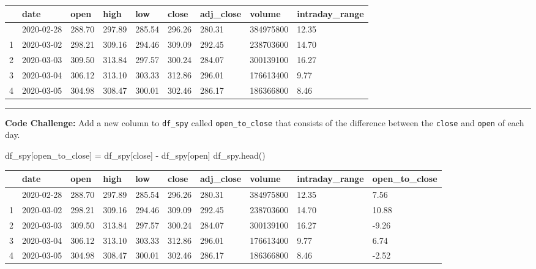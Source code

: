 \documentclass[
  letterpaper,
  DIV=11,
  numbers=noendperiod]{scrreprt}
\newenvironment{Shaded}{\begin{snugshade}}{\end{snugshade}}
\newcommand{\NormalTok}[1]{\textcolor[rgb]{0.00,0.23,0.31}{#1}}
\newcommand{\OperatorTok}[1]{\textcolor[rgb]{0.37,0.37,0.37}{#1}}
\newcommand{\StringTok}[1]{\textcolor[rgb]{0.13,0.47,0.30}{#1}}
\begin{document}
\begin{longtable}[]{@{}lllllllll@{}}
\toprule\noalign{}
& date & open & high & low & close & adj\_close & volume &
intraday\_range \\
\midrule\noalign{}
\endhead
\bottomrule\noalign{}
\endlastfoot
0 & 2020-02-28 & 288.70 & 297.89 & 285.54 & 296.26 & 280.31 & 384975800
& 12.35 \\
1 & 2020-03-02 & 298.21 & 309.16 & 294.46 & 309.09 & 292.45 & 238703600
& 14.70 \\
2 & 2020-03-03 & 309.50 & 313.84 & 297.57 & 300.24 & 284.07 & 300139100
& 16.27 \\
3 & 2020-03-04 & 306.12 & 313.10 & 303.33 & 312.86 & 296.01 & 176613400
& 9.77 \\
4 & 2020-03-05 & 304.98 & 308.47 & 300.01 & 302.46 & 286.17 & 186366800
& 8.46 \\
\end{longtable}

\begin{center}\rule{0.5\linewidth}{0.5pt}\end{center}

\textbf{Code Challenge:} Add a new column to \texttt{df\_spy} called
\texttt{open\_to\_close} that consists of the difference between the
\texttt{close} and \texttt{open} of each day.

\begin{Shaded}
\begin{Highlighting}[]
\NormalTok{df\_spy[}\StringTok{\textquotesingle{}open\_to\_close\textquotesingle{}}\NormalTok{] }\OperatorTok{=}\NormalTok{ df\_spy[}\StringTok{\textquotesingle{}close\textquotesingle{}}\NormalTok{] }\OperatorTok{{-}}\NormalTok{ df\_spy[}\StringTok{\textquotesingle{}open\textquotesingle{}}\NormalTok{]}
\NormalTok{df\_spy.head()}
\end{Highlighting}
\end{Shaded}

\begin{longtable}[]{@{}llllllllll@{}}
\toprule\noalign{}
& date & open & high & low & close & adj\_close & volume &
intraday\_range & open\_to\_close \\
\midrule\noalign{}
\endhead
\bottomrule\noalign{}
\endlastfoot
0 & 2020-02-28 & 288.70 & 297.89 & 285.54 & 296.26 & 280.31 & 384975800
& 12.35 & 7.56 \\
1 & 2020-03-02 & 298.21 & 309.16 & 294.46 & 309.09 & 292.45 & 238703600
& 14.70 & 10.88 \\
2 & 2020-03-03 & 309.50 & 313.84 & 297.57 & 300.24 & 284.07 & 300139100
& 16.27 & -9.26 \\
3 & 2020-03-04 & 306.12 & 313.10 & 303.33 & 312.86 & 296.01 & 176613400
& 9.77 & 6.74 \\
4 & 2020-03-05 & 304.98 & 308.47 & 300.01 & 302.46 & 286.17 & 186366800
& 8.46 & -2.52 \\
\end{longtable}
\end{document}
